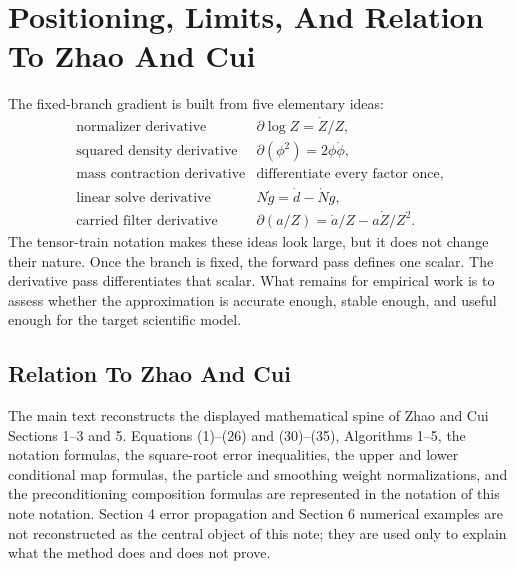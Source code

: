 \documentclass[11pt]{article}
\numberwithin{equation}{section}
\begin{document}
\section{Positioning, Limits, And Relation To Zhao And Cui}

The fixed-branch gradient is built from five elementary ideas:
\begin{equation}
\begin{array}{ll}
\text{normalizer derivative} & \partial\log Z=\dot Z/Z,\\[2mm]
\text{squared density derivative} & \partial(\phi^2)=2\phi\dot\phi,\\[2mm]
\text{mass contraction derivative} & \text{differentiate every factor once},\\[2mm]
\text{linear solve derivative} & N\dot g=\dot d-\dot N g,\\[2mm]
\text{carried filter derivative} & \partial(a/Z)=\dot a/Z-a\dot Z/Z^2.
\end{array}
\label{eq:p24-p19-110}
\end{equation}
The tensor-train notation makes these ideas look large, but it does not change
their nature.  Once the branch is fixed, the forward pass defines one scalar.
The derivative pass differentiates that scalar.  What remains for empirical
work is to assess whether the approximation is accurate enough, stable enough,
and useful enough for the target scientific model.

\subsection{Relation To Zhao And Cui}

The main text reconstructs the displayed mathematical spine of Zhao and Cui \cite{zhao2024ttsequential}
Sections 1--3 and 5.  Equations (1)--(26) and (30)--(35), Algorithms 1--5,
the notation formulas, the square-root error inequalities, the upper and lower
conditional map formulas, the particle and smoothing weight normalizations, and
the preconditioning composition formulas are represented in the notation of this note
notation.  Section 4 error propagation and Section 6 numerical examples are
not reconstructed as the central object of this note; they are used only to
explain what the method does and does not prove.

\appendix



\end{document}
